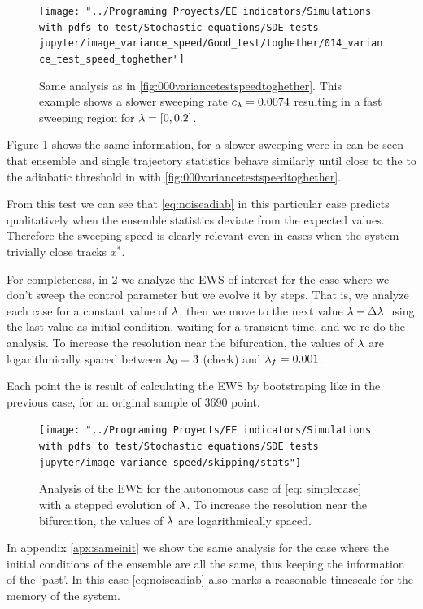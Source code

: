 \begin{figure}[tbp]
	\centering
	\texttt{[image: "../Programing Proyects/EE indicators/Simulations with pdfs to test/Stochastic equations/SDE tests jupyter/image\_variance\_speed/Good\_test/toghether/014\_variance\_test\_speed\_toghether"]}
	\caption{Same analysis as in \cref{fig:000variancetestspeedtoghether}. This example shows a slower sweeping rate $c_{\lambda}=0.0074$ resulting in a fast sweeping region for $\lambda=[0,0.2]$.}
	\label{fig:014variancetestspeedtoghether}
\end{figure}


Figure \ref{fig:014variancetestspeedtoghether} shows the same information, for a slower sweeping were in can be seen that ensemble and single trajectory statistics behave similarly until close to the to the adiabatic threshold in with  \ref{fig:000variancetestspeedtoghether}.

From this test we can see that   \cref{eq:noiseadiab} in this particular case predicts qualitatively when the ensemble statistics deviate from the expected values.
Therefore the sweeping speed is clearly relevant even in cases when the system trivially close tracks $x^*$.

For completeness, in \cref{fig:stats} we analyze the EWS of interest for the case where  we don't sweep the control parameter but we evolve it by steps. That is, we analyze each case for a constant value of $\lambda$, then we move to the next value $\lambda-\Delta \lambda$ using the last value as initial condition, waiting for a transient time, and we re-do the analysis. 
To increase the resolution near the bifurcation, the values of $\lambda$ are logarithmically spaced between $\lambda_0=3$ (check) and $\lambda_f=0.001$. 

Each point the is result of calculating the EWS by bootstraping like in the previous case, for an original sample of 3690 point.
\begin{figure}
	\centering
	\texttt{[image: "../Programing Proyects/EE indicators/Simulations with pdfs to test/Stochastic equations/SDE tests jupyter/image\_variance\_speed/skipping/stats"]}
	\caption{Analysis of the EWS for the autonomous case of \cref{eq: simplecase} with a stepped evolution of $\lambda$. To increase the resolution near the bifurcation, the values of $\lambda$ are logarithmically spaced.  }
	\label{fig:stats}
\end{figure}


In appendix \ref{apx:sameinit} we show the same analysis for the case where the initial conditions of the ensemble are all the same, thus keeping the information of the 'past'. In this case \cref{eq:noiseadiab} also marks a reasonable timescale for the memory of the system.



